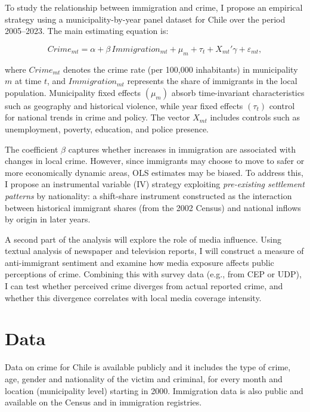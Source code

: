 To study the relationship between immigration and crime, I propose an empirical strategy using a municipality-by-year panel dataset for Chile over the period 2005--2023. The main estimating equation is:

\begin{equation}
	Crime_{mt} = \alpha + \beta \, Immigration_{mt} + \mu_m + \tau_t + X_{mt}'\gamma + \varepsilon_{mt},
\end{equation}

\noindent where $Crime_{mt}$ denotes the crime rate (per 100,000 inhabitants) in municipality $m$ at time $t$, and $Immigration_{mt}$ represents the share of immigrants in the local population. Municipality fixed effects $(\mu_m)$ absorb time-invariant characteristics such as geography and historical violence, while year fixed effects $(\tau_t)$ control for national trends in crime and policy. The vector $X_{mt}$ includes controls such as unemployment, poverty, education, and police presence.

The coefficient $\beta$ captures whether increases in immigration are associated with changes in local crime. However, since immigrants may choose to move to safer or more economically dynamic areas, OLS estimates may be biased. To address this, I propose an instrumental variable (IV) strategy exploiting \emph{pre-existing settlement patterns} by nationality: a shift-share instrument constructed as the interaction between historical immigrant shares (from the 2002 Census) and national inflows by origin in later years.

A second part of the analysis will explore the role of media influence. Using textual analysis of newspaper and television reports, I will construct a measure of anti-immigrant sentiment and examine how media exposure affects public perceptions of crime. Combining this with survey data (e.g., from CEP or UDP), I can test whether perceived crime diverges from actual reported crime, and whether this divergence correlates with local media coverage intensity.


\section{ Data}

Data on crime for Chile is available publicly and it includes the type of crime, age, gender and nationality of the victim and criminal, for every month and location (municipality level) starting in 2000. Immigration data is also public and available 
on the Census and in immigration registries.

